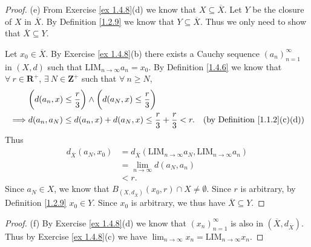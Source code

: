 \begin{proof}{(e)}
    From Exercise \ref{ex 1.4.8}(d) we know that \(X \subseteq \overline{X}\).
    Let \(Y\) be the closure of \(X\) in \(\overline{X}\).
    By Definition \ref{1.2.9} we know that \(Y \subseteq \overline{X}\).
    Thus we only need to show that \(\overline{X} \subseteq Y\).

    Let \(x_0 \in \overline{X}\).
    By Exercise \ref{ex 1.4.8}(b) there exists a Cauchy sequence \((a_n)_{n = 1}^\infty\) in \((X, d)\) such that \(\text{LIM}_{n \to \infty} a_n = x_0\).
    By Definition \ref{1.4.6} we know that \(\forall\ r \in \mathbf{R}^+\), \(\exists\ N \in \mathbf{Z}^+\) such that \(\forall\ n \geq N\),
    \begin{align*}
                 & \bigg(d(a_n, x) \leq \frac{r}{3}\bigg) \land \bigg(d(a_N, x) \leq \frac{r}{3}\bigg)                                            \\
        \implies & d(a_n, a_N) \leq d(a_n, x) + d(a_N, x) \leq \frac{r}{3} + \frac{r}{3} < r.          & \text{(by Definition \ref{1.1.2}(c)(d))}
    \end{align*}
    Thus
    \begin{align*}
        d_{\overline{X}}(a_N, x_0) & = d_{\overline{X}}(\text{LIM}_{n \to \infty} a_N, \text{LIM}_{n \to \infty} a_n) \\
                                   & = \lim_{n \to \infty} d(a_N, a_n)                                                \\
                                   & < r.
    \end{align*}
    Since \(a_N \in X\), we know that \(B_{(X, d_{\overline{X}})}(x_0, r) \cap X \neq \emptyset\).
    Since \(r\) is arbitrary, by Definition \ref{1.2.9} \(x_0 \in Y\).
    Since \(x_0\) is arbitrary, we thus have \(\overline{X} \subseteq Y\).
\end{proof}

\begin{proof}{(f)}
    By Exercise \ref{ex 1.4.8}(d) we know that \((x_n)_{n = 1}^\infty\) is also in \((\overline{X}, d_{\overline{X}})\).
    Thus by Exercise \ref{ex 1.4.8}(c) we have \(\lim_{n \to \infty} x_n = \text{LIM}_{n \to \infty} x_n\).
\end{proof}